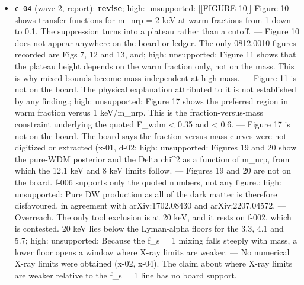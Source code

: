 \documentclass[11pt,a4paper]{article}
\begin{document}
\begin{itemize}
  \item \texttt{c-04} (wave 2, report): \textbf{revise}; high: unsupported: [[FIGURE 10]] Figure 10 shows transfer functions for m\_nrp = 2 keV at warm fractions from 1 down to 0.1. The suppression turns into a plateau rather than a cutoff. --- Figure 10 does not appear anywhere on the board or ledger. The only 0812.0010 figures recorded are Figs 7, 12 and 13, and; high: unsupported: Figure 11 shows that the plateau height depends on the warm fraction only, not on the mass. This is why mixed bounds become mass-independent at high mass. --- Figure 11 is not on the board. The physical explanation attributed to it is not established by any finding.; high: unsupported: Figure 17 shows the preferred region in warm fraction versus 1 keV/m\_nrp. This is the fraction-versus-mass constraint underlying the quoted F\_wdm \textless{} 0.35 and \textless{} 0.6. --- Figure 17 is not on the board. The board says the fraction-versus-mass curves were not digitized or extracted (x-01, d-02; high: unsupported: Figures 19 and 20 show the pure-WDM posterior and the Delta chi\textasciicircum{}2 as a function of m\_nrp, from which the 12.1 keV and 8 keV limits follow. --- Figures 19 and 20 are not on the board. f-006 supports only the quoted numbers, not any figure.; high: unsupported: Pure DW production as all of the dark matter is therefore disfavoured, in agreement with arXiv:1702.08430 and arXiv:2207.04572. --- Overreach. The only tool exclusion is at 20 keV, and it rests on f-002, which is contested. 20 keV lies below the Lyman-alpha floors for the 3.3, 4.1 and 5.7; high: unsupported: Because the f\_s = 1 mixing falls steeply with mass, a lower floor opens a window where X-ray limits are weaker. --- No numerical X-ray limits were obtained (x-02, x-04). The claim about where X-ray limits are weaker relative to the f\_s = 1 line has no board support.

\end{itemize}
\end{document}
